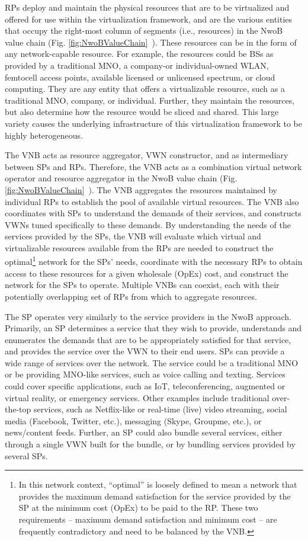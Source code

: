 \documentclass[12pt,dvipsnames]{report}
\begin{document}
RPs deploy and maintain the physical resources that are to be virtualized and offered for use within the virtualization framework, and are the various entities that occupy the right-most column of segments (i.e., resources) in the NwoB value chain (Fig. \ref{fig:NwoBValueChain}~\cite{6737248}).  These resources can be in the form of any network-capable resource.  For example, the resources could be BSs as provided by a traditional MNO, a company-or individual-owned WLAN, femtocell access points, available licensed or unlicensed spectrum, or cloud computing.  They are any entity that offers a virtualizable resource, such as a traditional MNO, company, or individual.  Further, they maintain the resources, but also determine how the resource would be sliced and shared.  This large variety causes the underlying infrastructure of this virtualization framework to be highly heterogeneous.

The VNB acts as resource aggregator, VWN constructor, and as intermediary between SPs and RPs.  Therefore, the VNB acts as a combination virtual network operator and resource aggregator in the NwoB value chain (Fig. \ref{fig:NwoBValueChain}~\cite{6737248}).  The VNB aggregates the resources maintained by individual RPs to establish the pool of available virtual resources.  The VNB also coordinates with SPs to understand the demands of their services, and constructs VWNs tuned specifically to these demands.  By understanding the needs of the services provided by the SPs, the VNB will evaluate which virtual and virtualizable resources available from the RPs are needed to construct the optimal\footnote{In this network context, ``optimal'' is loosely defined to mean a network that provides the maximum demand satisfaction for the service provided by the SP at the minimum cost (OpEx) to be paid to the RP.  These two requirements -- maximum demand satisfaction and minimum cost -- are frequently contradictory and need to be balanced by the VNB.} network for the SPs' needs, coordinate with the necessary RPs to obtain access to these resources for a given wholesale (OpEx) cost, and construct the network for the SPs to operate.  Multiple VNBs can coexist, each with their potentially overlapping set of RPs from which to aggregate resources.

The SP operates very similarly to the service providers in the NwoB approach.  Primarily, an SP determines a service that they wish to provide, understands and enumerates the demands that are to be appropriately satisfied for that service, and provides the service over the VWN to their end users.  SPs can provide a wide range of services over the network.  The service could be a traditional MNO or be providing MNO-like services, such as voice calling and texting.  Services could cover specific applications, such as IoT, teleconferencing, augmented or virtual reality, or emergency services.  Other examples include traditional over-the-top services, such as Netflix-like or real-time (live) video streaming, social media (Facebook, Twitter, etc.), messaging (Skype, Groupme, etc.), or news/content feeds.  Further, an SP could also bundle several services, either through a single VWN built for the bundle, or by bundling services provided by several SPs.
\end{document}
